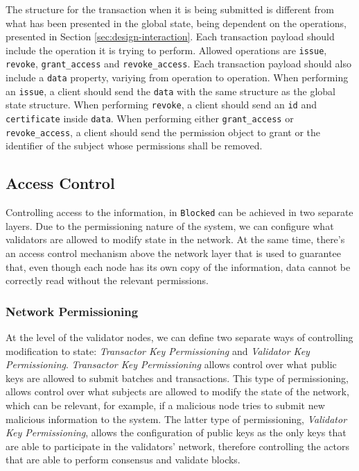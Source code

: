 The structure for the transaction when it is being submitted is different from what has been presented in the global state, being dependent on the operations, presented in Section \ref{sec:design-interaction}. Each transaction payload should include the operation it is trying to perform. Allowed operations are \texttt{issue}, \texttt{revoke}, \texttt{grant\_access} and \texttt{revoke\_access}. Each transaction payload should also include a \texttt{data} property, variying from operation to operation. When performing an \texttt{issue}, a client should send the \texttt{data} with the same structure as the global state structure. When performing \texttt{revoke}, a client should send an \texttt{id} and \texttt{certificate} inside \texttt{data}. When performing either \texttt{grant\_access} or \texttt{revoke\_access}, a client should send the permission object to grant or the identifier of the subject whose permissions shall be removed.

\subsection{Access Control}
\label{sec:design-ac}

Controlling access to the information, in \texttt{Blocked} can be achieved in two separate layers. Due to the permissioning nature of the system, we can configure what validators are allowed to modify state in the network. At the same time, there's an access control mechanism above the network layer that is used to guarantee that, even though each node has its own copy of the information, data cannot be correctly read without the relevant permissions.

\subsubsection{Network Permissioning}

At the level of the validator nodes, we can define two separate ways of controlling modification to state: \emph{Transactor Key Permissioning} and \textit{Validator Key Permissioning}. \emph{Transactor Key Permissioning} allows control over what public keys are allowed to submit batches and transactions. This type of permissioning, allows control over what subjects are allowed to modify the state of the network, which can be relevant, for example, if a malicious node tries to submit new malicious information to the system. The latter type of permissioning, \textit{Validator Key Permissioning}, allows the configuration of public keys as the only keys that are able to participate in the validators' network, therefore controlling the actors that are able to perform consensus and validate blocks.

